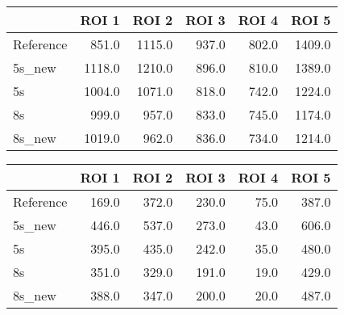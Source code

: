 \begin{tabular}{lrrrrr}
\toprule
{} &   ROI 1 &   ROI 2 &  ROI 3 &  ROI 4 &   ROI 5 \\
\midrule
Reference &   851.0 &  1115.0 &  937.0 &  802.0 &  1409.0 \\
5s\_new    &  1118.0 &  1210.0 &  896.0 &  810.0 &  1389.0 \\
5s        &  1004.0 &  1071.0 &  818.0 &  742.0 &  1224.0 \\
8s        &   999.0 &   957.0 &  833.0 &  745.0 &  1174.0 \\
8s\_new    &  1019.0 &   962.0 &  836.0 &  734.0 &  1214.0 \\
\bottomrule
\end{tabular}
\begin{tabular}{lrrrrr}
\toprule
{} &  ROI 1 &  ROI 2 &  ROI 3 &  ROI 4 &  ROI 5 \\
\midrule
Reference &  169.0 &  372.0 &  230.0 &   75.0 &  387.0 \\
5s\_new    &  446.0 &  537.0 &  273.0 &   43.0 &  606.0 \\
5s        &  395.0 &  435.0 &  242.0 &   35.0 &  480.0 \\
8s        &  351.0 &  329.0 &  191.0 &   19.0 &  429.0 \\
8s\_new    &  388.0 &  347.0 &  200.0 &   20.0 &  487.0 \\
\bottomrule
\end{tabular}
